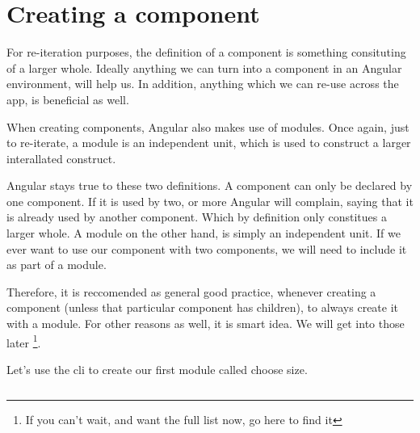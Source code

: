 \maketitle{}
\section{ Creating a component }

For re-iteration purposes, the definition of a component is something consituting
of a larger whole. Ideally anything we can turn into a component in an Angular
environment, will help us. In addition, anything which we can re-use across the
app, is beneficial as well.

When creating components, Angular also makes use of modules. Once again, just to
re-iterate, a module is an independent unit, which is used to construct a larger
interallated construct.

Angular stays true to these two definitions. A component can only be declared by
one component. If it is used by two, or more Angular will complain, saying that it
is already used by another component. Which by definition only constitues a larger whole.
A module on the other hand, is simply an independent unit. If we ever want to use
our component with two components, we will need to include it as part of a module.

Therefore, it is reccomended as general good practice, whenever creating a
component (unless that particular component has children), to always create it
with a module. For other reasons as well, it is smart idea. We will get into
those later \footnote{If you can't wait, and want the full list now, go here to
find it}.

Let's use the cli to create our first module called choose size.
\begin{verbatim}

\end{verbatim}
